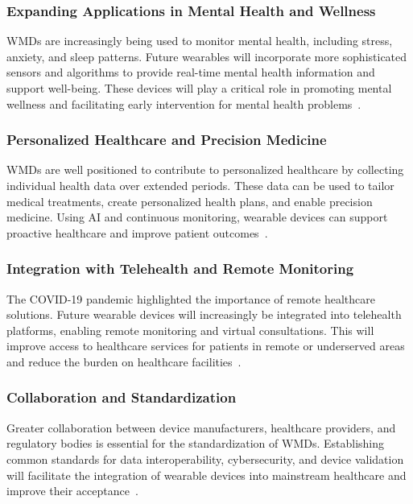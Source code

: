 \documentclass[journal]{IEEEtran}
\begin{document}
        \subsubsection{Expanding Applications in Mental Health and Wellness}

        WMDs are increasingly being used to monitor mental health, including stress, anxiety, and sleep patterns. Future wearables will incorporate more sophisticated sensors and algorithms to provide real-time mental health information and support well-being. These devices will play a critical role in promoting mental wellness and facilitating early intervention for mental health problems~\cite{Iqbal2016}.

        \subsubsection{Personalized Healthcare and Precision Medicine}

        WMDs are well positioned to contribute to personalized healthcare by collecting individual health data over extended periods. These data can be used to tailor medical treatments, create personalized health plans, and enable precision medicine. Using AI and continuous monitoring, wearable devices can support proactive healthcare and improve patient outcomes~\cite{Cusack2024}.

        \subsubsection{Integration with Telehealth and Remote Monitoring}

        The COVID-19 pandemic highlighted the importance of remote healthcare solutions. Future wearable devices will increasingly be integrated into telehealth platforms, enabling remote monitoring and virtual consultations. This will improve access to healthcare services for patients in remote or underserved areas and reduce the burden on healthcare facilities~\cite{Nahavandi2022, Cusack2024}.

        \subsubsection{Collaboration and Standardization}

        Greater collaboration between device manufacturers, healthcare providers, and regulatory bodies is essential for the standardization of WMDs. Establishing common standards for data interoperability, cybersecurity, and device validation will facilitate the integration of wearable devices into mainstream healthcare and improve their acceptance~\cite{Ravizza2019}.
\end{document}
